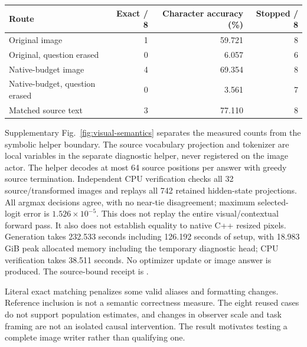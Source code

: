 \documentclass[10pt,a4paper]{article}
\begin{document}
\begin{center}\small
\begin{tabular}{lrrr}\toprule
Route & Exact / 8 & Character accuracy (\%) & Stopped / 8\\\midrule
Original image & 1 & 59.721 & 8\\
Original, question erased & 0 & 6.057 & 6\\
Native-budget image & 4 & 69.354 & 8\\
Native-budget, question erased & 0 & 3.561 & 7\\
Matched source text & 3 & 77.110 & 8\\\bottomrule
\end{tabular}
\end{center}

Supplementary Fig.~\ref{fig:visual-semantics} separates the measured counts
from the symbolic helper boundary.
The source vocabulary projection and tokenizer are local variables in the
separate diagnostic helper, never registered on the image actor. The helper
decodes at most 64 source positions per answer with greedy source termination.
Independent CPU verification checks all 32 source/transformed images and
replays all 742 retained hidden-state projections. All argmax decisions agree,
with no near-tie disagreement; maximum selected-logit error is
$1.526\times10^{-5}$. This does not replay the entire visual/contextual forward
pass. It also does not establish equality to native C++ resized pixels.
Generation takes 232.533 seconds including 126.192 seconds of setup, with
18.983 GiB peak allocated memory including the temporary diagnostic head;
CPU verification takes 38.511 seconds. No optimizer update or image answer
is produced. The source-bound receipt is
.

Literal exact matching penalizes some valid aliases and formatting changes.
Reference inclusion is not a semantic correctness measure. The eight reused
cases do not support population estimates, and changes in observer scale and
task framing are not an isolated causal intervention. The result motivates
testing a complete image writer rather than qualifying one.

\end{document}
